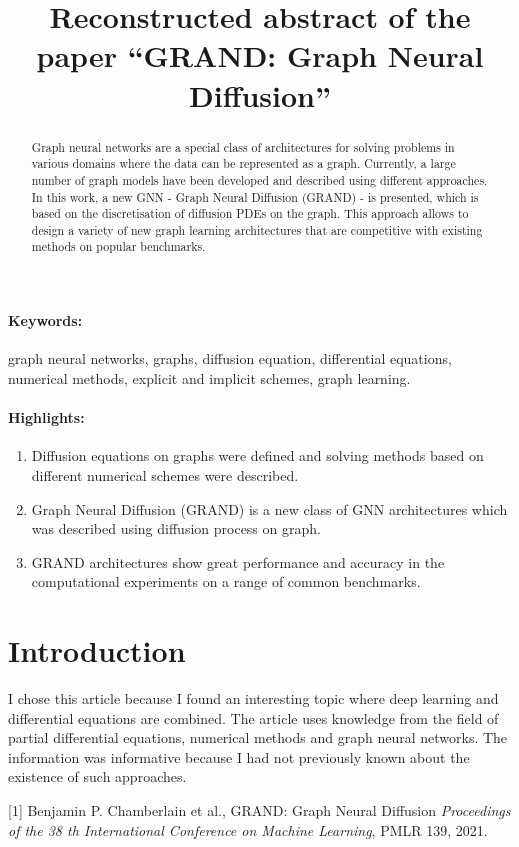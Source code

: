 \documentclass[12pt]{article}
\title{Reconstructed abstract of the paper ``GRAND: Graph Neural Diffusion''}
\date{}
\begin{document}
\maketitle

\begin{abstract}
Graph neural networks are a special class of architectures for solving problems in various domains where the data can be represented as a graph. Currently, a large number of graph models have been developed and described using different approaches. In this work, a new GNN - Graph Neural Diffusion (GRAND) - is presented, which is based on the discretisation of diffusion PDEs on the graph. This approach allows to design a variety of new graph learning architectures that are competitive with existing methods on popular benchmarks.
\end{abstract}
\paragraph{Keywords:} graph neural networks, graphs, diffusion equation, differential equations, numerical methods, explicit and implicit schemes, graph learning.

\paragraph{Highlights:}
\begin{enumerate}
\item Diffusion equations on graphs were defined and solving methods based on different numerical schemes were described.
\item Graph Neural Diffusion (GRAND) is a new class of GNN architectures which was described using diffusion process on graph.
\item GRAND architectures show great performance and accuracy in the computational experiments on a range of common benchmarks.
\end{enumerate}

\section{Introduction}
I chose this article \cite{chamberlain21} because I found an interesting topic where deep learning and differential equations are combined. The article uses knowledge from the field of partial differential equations, numerical methods and graph neural networks. The information was informative because I had not previously known about the existence of such approaches. 

% 

\begin{thebibliography}

  [1] Benjamin P. Chamberlain et al.,
  GRAND: Graph Neural Diffusion
  \emph{Proceedings of the 38 th International Conference on Machine
Learning},
  PMLR 139, 2021.

\end{thebibliography}
\end{document}

